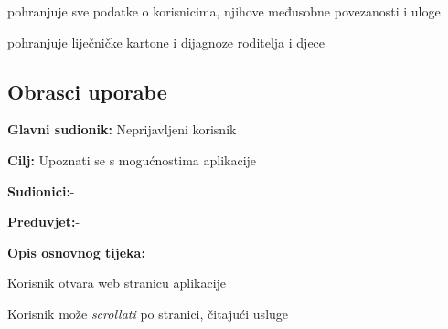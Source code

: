 \begin{packed_enum}
\begin{packed_enum}
				\end{packed_enum}
				
				\item  {}
				
				\begin{packed_enum}
					
					\item pohranjuje sve podatke o korisnicima, njihove međusobne povezanosti i uloge
					\item pohranjuje liječničke kartone i dijagnoze roditelja i djece
					
				\end{packed_enum}
				
			\end{packed_enum}
			
			\eject 
			
			
				
			\subsection{Obrasci uporabe}
					\noindent {}
					\begin{packed_item}
	
						\item \textbf{Glavni sudionik: }Neprijavljeni korisnik
						\item  \textbf{Cilj:} Upoznati se s mogućnostima aplikacije
						\item  \textbf{Sudionici:}-
						\item  \textbf{Preduvjet:}-
						\item  \textbf{Opis osnovnog tijeka:}
						
						\item[] \begin{packed_enum}
	
							\item Korisnik otvara web stranicu aplikacije
							\item Korisnik može \textit{scrollati} po stranici, čitajući usluge
						\end{packed_enum}
					\end{packed_item}
					

